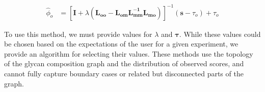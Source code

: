 \begin{align}
            {\hat \phi_o} &= \left[
                \mathbf{I} + \lambda\left(\mathbf{L_{oo}} -
                    \mathbf{L_{om}}\mathbf{L_{mm}^{-1}}\mathbf{L_{mo}}
                \right)
            \right]^{-1}(\mathbf{s} - \tau_o) + \tau_o
            \label{eqn:estimate_of_phi_o}
        \end{align}

        To use this method, we must provide values for $\lambda$ and $\mathbf{\tau}$.
        While these values could be chosen based on the expectations of the user for
        a given experiment, we provide an algorithm for selecting their values.
        These methods use the topology of the glycan composition graph and the
        distribution of observed scores, and cannot fully capture boundary cases
        or related but disconnected parts of the graph.
